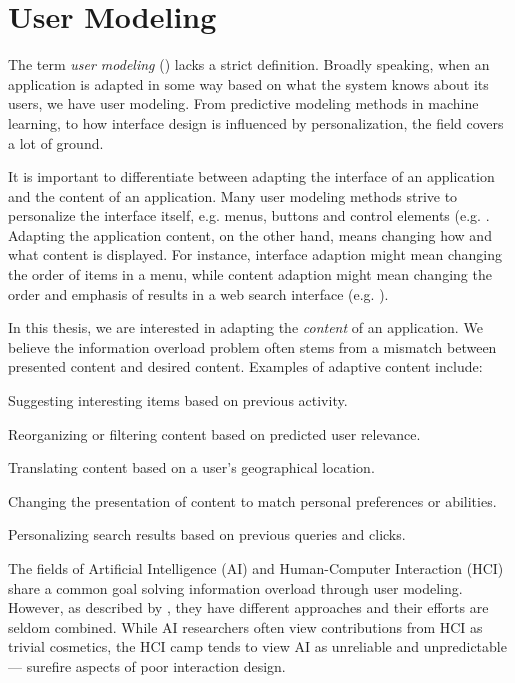 \section{User Modeling}
\label{sec:modeling}

The term \emph{user modeling} () lacks a strict definition. 
Broadly speaking, when an application is adapted in some way based on what the system knows about its users, we have user modeling. 
From predictive modeling methods in machine learning, 
to how interface design is influenced by personalization, the field covers a lot of ground. 

It is important to differentiate between adapting the interface of an application and the content of an application. 
Many user modeling methods strive to personalize the interface itself, e.g. menus, buttons and control elements 
(e.g. \cite{Jameson2009, Fischer2001}. 
Adapting the application content, on the other hand, means changing how and what content is displayed.
For instance, interface adaption might mean changing the order of items in a menu, while content 
adaption might mean changing the order and emphasis of results in a web search interface
(e.g. \cite{Xu2008, Qiu2006, Rhodes2000}).

In this thesis, we are interested in adapting the \emph{content} of an application.
We believe the information overload problem often stems from a mismatch between presented content and desired content. 
Examples of adaptive content include:

\begin{itemize*}
  \item Suggesting interesting items based on previous activity.
  \item Reorganizing or filtering content based on predicted user relevance.
  \item Translating content based on a user's geographical location.
  \item Changing the presentation of content to match personal preferences or abilities.
  \item Personalizing search results based on previous queries and clicks.
\end{itemize*}

The fields of Artificial Intelligence (AI) and Human-Computer Interaction (HCI) share a common goal solving information overload through user modeling. 
However, as described by \cite[p.6]{Lieberman2009}, they have different approaches and their efforts are seldom combined. 
While AI researchers often view contributions from HCI as trivial cosmetics, the HCI camp
tends to view AI as unreliable and unpredictable --- surefire aspects of poor interaction design.

